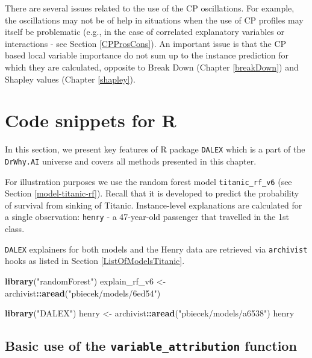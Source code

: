 \documentclass[]{krantz}
\newenvironment{Shaded}{\begin{snugshade}}{\end{snugshade}}
\newcommand{\KeywordTok}[1]{\textcolor[rgb]{0.13,0.29,0.53}{\textbf{#1}}}
\newcommand{\NormalTok}[1]{#1}
\newcommand{\OperatorTok}[1]{\textcolor[rgb]{0.81,0.36,0.00}{\textbf{#1}}}
\newcommand{\StringTok}[1]{\textcolor[rgb]{0.31,0.60,0.02}{#1}}
\begin{document}
There are several issues related to the use of the CP oscillations. For example, the oscillations may not be of help in situations when the use of CP profiles may itself be problematic (e.g., in the case of correlated explanatory variables or interactions - see Section \ref{CPProsCons}). An important issue is that the CP based local variable importance do not sum up to the instance prediction for which they are calculated, opposite to Break Down (Chapter \ref{breakDown}) and Shapley values (Chapter \ref{shapley}).

\hypertarget{CPOscR}{%
\section{Code snippets for R}\label{CPOscR}}

In this section, we present key features of R package \texttt{DALEX} which is a part of the \texttt{DrWhy.AI} universe and covers all methods presented in this chapter.

For illustration purposes we use the random forest model \texttt{titanic\_rf\_v6} (see Section \ref{model-titanic-rf}). Recall that it is developed to predict the probability of survival from sinking of Titanic. Instance-level explanations are calculated for a single observation: \texttt{henry} - a 47-year-old passenger that travelled in the 1st class.

\texttt{DALEX} explainers for both models and the Henry data are retrieved via \texttt{archivist} hooks as listed in Section \ref{ListOfModelsTitanic}.

\begin{Shaded}
\begin{Highlighting}[]
\KeywordTok{library}\NormalTok{(}\StringTok{"randomForest"}\NormalTok{)}
\NormalTok{explain_rf_v6 <-}\StringTok{ }\NormalTok{archivist}\OperatorTok{::}\KeywordTok{aread}\NormalTok{(}\StringTok{"pbiecek/models/6ed54"}\NormalTok{)}

\KeywordTok{library}\NormalTok{(}\StringTok{"DALEX"}\NormalTok{)}
\NormalTok{henry <-}\StringTok{ }\NormalTok{archivist}\OperatorTok{::}\KeywordTok{aread}\NormalTok{(}\StringTok{"pbiecek/models/a6538"}\NormalTok{)}
\NormalTok{henry}
\end{Highlighting}
\end{Shaded}

\hypertarget{basic-use-of-the-variable_attribution-function-1}{%
\subsection{\texorpdfstring{Basic use of the \texttt{variable\_attribution} function}{Basic use of the variable\_attribution function}}\label{basic-use-of-the-variable_attribution-function-1}}
\end{document}
